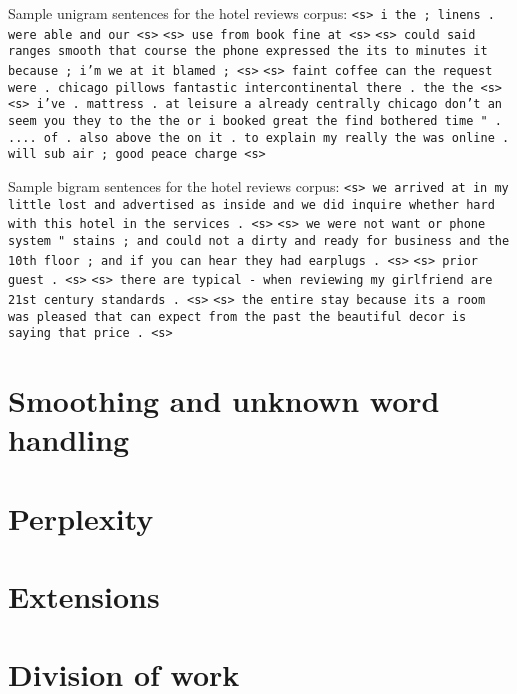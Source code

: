 \documentclass{article}
\begin{document}
Sample unigram sentences for the hotel reviews corpus:\npar
\texttt{<s> i the ; linens . were able and our <s>}\npar
\texttt{<s> use from book fine at <s>}\npar
\texttt{<s> could said ranges smooth that course the phone expressed the its to minutes it because ; i'm we at it blamed ; <s>}\npar
\texttt{<s> faint coffee can the request were . chicago pillows fantastic intercontinental there . the the <s>}\npar
\texttt{<s> i've . mattress . at leisure a already centrally chicago don't an seem you they to the the or i booked great the find bothered time " . .... of . also above the on it . to explain my really the was online . will sub air ; good peace charge <s>}\npar
\bigskip

Sample bigram sentences for the hotel reviews corpus:\npar
\texttt{<s> we arrived at in my little lost and advertised as inside and we did inquire whether hard with this hotel in the services . <s>}\npar
\texttt{<s> we were not want or phone system " stains ; and could not a dirty and ready for business and the 10th floor ; and if you can hear they had earplugs . <s>}\npar
\texttt{<s> prior guest . <s>}\npar
\texttt{<s> there are typical - when reviewing my girlfriend are 21st century standards . <s>}\npar
\texttt{<s> the entire stay because its a room was pleased that can expect from the past the beautiful decor is saying that price . <s>}\npar

\fi

\section{Smoothing and unknown word handling}
\lipsum[4]

\section{Perplexity}
\lipsum[4]

\section{Extensions}
\lipsum[4]

\section{Division of work}
\lipsum[4]
\end{document}
